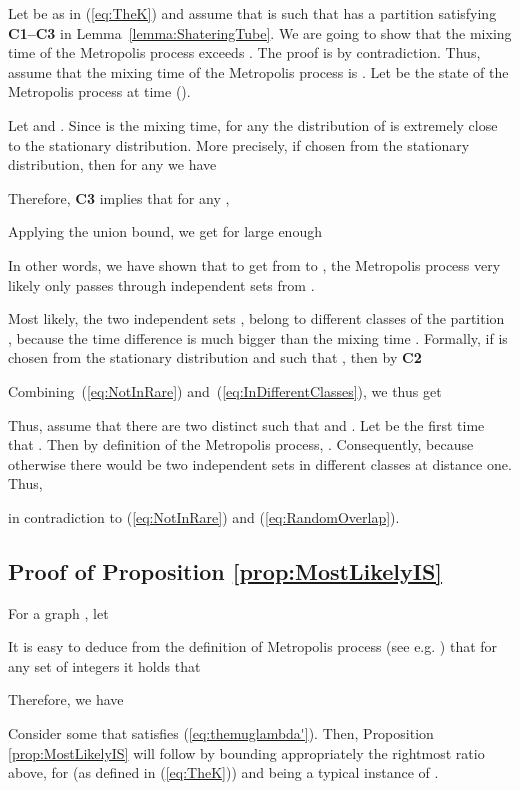 \documentclass[a4paper,10pt]{article}
\newcommand{\qed}{\hfill\smallskip}
\newcommand\Cor{Corollary}
\begin{document}
\medskip\noindent{\bf Proof of \Cor~\ref{cor:MixingTimeBound}:}
Let  be as in (\ref{eq:TheK}) and assume that  is such
that  has a partition  satisfying {\bf C1--C3} in
Lemma~\ref{lemma:ShateringTube}.
We are going to show that the mixing time of the Metropolis process exceeds .
The proof is by contradiction. Thus, assume that the mixing time
of the Metropolis process is .
Let  be the state of the Metropolis process at time ().

Let  and  .
Since  is the mixing time, for any  the
 distribution of  is extremely close to the stationary distribution.
More precisely, if  chosen from the stationary distribution, then for any  we have
	
Therefore, {\bf C3} implies that for any ,

Applying the union bound, we get for  large enough

In other words, we have shown that to get from 
to , the Metropolis process very likely only
passes through independent  sets from .

Most likely, the two independent sets , 
belong to different classes of the partition ,
because the time difference  is much bigger than the
mixing time . Formally, if  is chosen from the
stationary distribution and  such that ,
then by {\bf C2}

Combining~(\ref{eq:NotInRare}) and~(\ref{eq:InDifferentClasses}),
we thus get



\noindent
Thus, assume that there are two distinct  such that
 and .
Let  be the first time that .
Then by definition of the Metropolis process, .  Consequently, 
because otherwise there would be two independent sets in different
classes at distance one. Thus,

in contradiction to (\ref{eq:NotInRare}) and (\ref{eq:RandomOverlap}).
\qed



\subsection{Proof of Proposition \ref{prop:MostLikelyIS}}
\label{sec:prop:MostLikelyIS}
For a graph , let 
 
It is easy to deduce from the definition of  Metropolis process
(see e.g. \cite{jerrum-planted}) that for any set of  integers 
 it holds that

Therefore, we have

Consider some  that satisfies (\ref{eq:themuglambda'}).
Then, Proposition \ref{prop:MostLikelyIS} will follow by bounding
appropriately the rightmost ratio above, for  (as
defined in (\ref{eq:TheK})) and  being a typical instance of
.
\\ \vspace{-.3cm}
\end{document}
